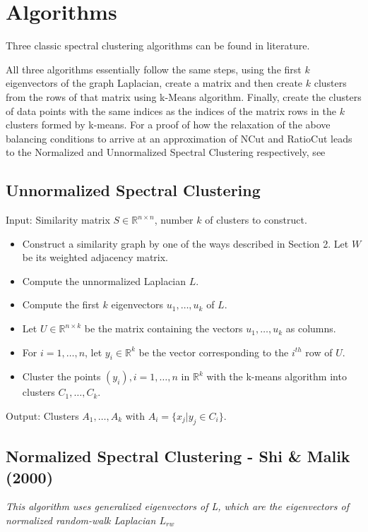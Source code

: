 \documentclass[10pt,a4paper, nocenter]{report}
\begin{document}
    \section{Algorithms}

    Three classic spectral clustering algorithms can be found in literature.

    All three algorithms essentially follow the same steps, using the first $k$ eigenvectors of the graph Laplacian, create a matrix and then create $k$ clusters from the rows of that matrix using k-Means algorithm. Finally, create the clusters of data points with the same indices as the indices of the matrix rows in the $k$ clusters formed by k-means. For a proof of how the relaxation of the above balancing conditions to arrive at an approximation of NCut and RatioCut leads to the Normalized and Unnormalized Spectral Clustering respectively, see \cite{Luxburg2007}
	
	\subsection{Unnormalized Spectral Clustering}
	
	Input: Similarity matrix $S \in \mathbb{R}^{n\times n}$, number $k$ of clusters to construct.
	\begin{itemize}
		\item Construct a similarity graph by one of the ways described in Section 2. Let $W$ be its weighted adjacency matrix.
		\item Compute the unnormalized Laplacian $L$.
		\item Compute the first $k$ eigenvectors $u_{1},\dots, u_{k} $ of $L$.
		\item Let $U \in \mathbb{R}^{n\times k}$ be the matrix containing the vectors $u_{1},\dots, u_{k}$ as columns.
		\item For $i = 1,\dots, n$, let $y_{i} \in \mathbb{R}^k$ be the vector corresponding to the $i^{th}$ row of $U$.
		\item Cluster the points $(y_{i}), i=1,\dots,n$ in $\mathbb{R}^k$ with the k-means algorithm into clusters
		$C_{1},\dots, C_{k}$.
	\end{itemize}
	Output: Clusters $A_{1},\dots, A_{k}$ with $A_{i} = \{x_{j}| y_{j} \in C_{i}\}$.
	

	\subsection{Normalized Spectral Clustering - Shi \& Malik (2000)\cite{Shi-Malik-maxcut-00}}
	\textit{This algorithm uses generalized eigenvectors of L, which are the eigenvectors of normalized random-walk Laplacian $L_{rw}$}
	
\end{document}
